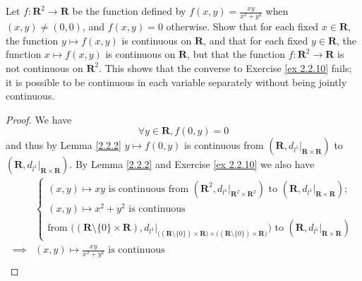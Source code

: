 \begin{exercise}\label{ex 2.2.11}
    Let \(f : \mathbf{R}^2 \to \mathbf{R}\) be the function defined by \(f(x, y) = \frac{xy}{x^2 + y^2}\) when \((x, y) \neq (0, 0)\), and \(f(x, y) = 0\) otherwise.
    Show that for each fixed \(x \in \mathbf{R}\), the function \(y \mapsto f(x, y)\) is continuous on \(\mathbf{R}\), and that for each fixed \(y \in \mathbf{R}\), the function \(x \mapsto f(x, y)\) is continuous on \(\mathbf{R}\), but that the function \(f : \mathbf{R}^2 \to \mathbf{R}\) is not continuous on \(\mathbf{R}^2\).
    This shows that the converse to Exercise \ref{ex 2.2.10} fails;
    it is possible to be continuous in each variable separately without being jointly continuous.
\end{exercise}

\begin{proof}
    We have
    \[
        \forall y \in \mathbf{R}, f(0, y) = 0
    \]
    and thus by Lemma \ref{2.2.2} \(y \mapsto f(0, y)\) is continuous from \((\mathbf{R}, d_{l^1}|_{\mathbf{R} \times \mathbf{R}})\) to \((\mathbf{R}, d_{l^1}|_{\mathbf{R} \times \mathbf{R}})\).
    By Lemma \ref{2.2.2} and Exercise \ref{ex 2.2.10} we also have
    \begin{align*}
                 & \begin{cases}
                       (x, y) \mapsto x y \text{ is continuous from } (\mathbf{R}^2, d_{l^1}|_{\mathbf{R}^2 \times \mathbf{R}^2}) \text{ to } (\mathbf{R}, d_{l^1}|_{\mathbf{R} \times \mathbf{R}}); \\
                       (x, y) \mapsto x^2 + y^2 \text{ is continuous}                                                                                                                                \\
                       \text{from } \big((\mathbf{R} \setminus \{0\} \times \mathbf{R}), d_{l^1}|_{\big((\mathbf{R} \setminus \{0\}) \times \mathbf{R}\big) \times \big((\mathbf{R} \setminus \{0\}) \times \mathbf{R}\big)}\big) \text{ to } (\mathbf{R}, d_{l^1}|_{\mathbf{R} \times \mathbf{R}})
                   \end{cases} \\
        \implies & (x, y) \mapsto \frac{xy}{x^2 + y^2} \text{ is continuous}                                                                                                                                                                                                                                                                                 \\

\end{align*}
\end{proof}
